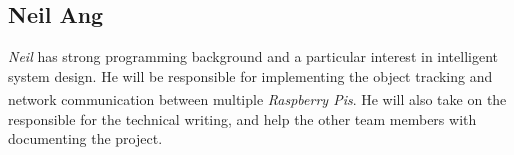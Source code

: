 \documentclass[11pt,a4paper,titlepage]{report}
\newcommand{\rpis}{\textit{Raspberry Pi\textsuperscript{\textregistered}s}}
\begin{document}
\subsection{Neil Ang}
\textit{Neil} has strong programming background and a particular interest in intelligent system design. He will be responsible for implementing the object tracking and network communication between multiple \rpis. He will also take on the responsible for the technical writing, and help the other team members with documenting the project. 




\nocite{*}
\printbibliography[heading=bibintoc]
\end{document}

